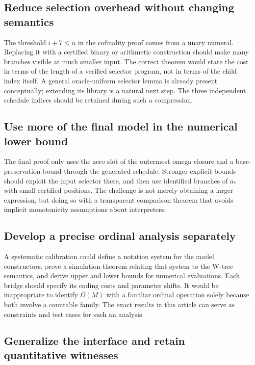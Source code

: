 \documentclass[11pt,letterpaper]{article}
\theoremstyle{definition}
\begin{document}
\subsection{Reduce selection overhead without changing semantics}

The threshold $i+7\le n$ in the cofinality proof comes from a unary numeral.
Replacing it with a certified binary or arithmetic construction should make
many branches visible at much smaller input. The correct theorem would
state the cost in terms of the length of a verified selector program, not in
terms of the child index itself. A general oracle-uniform selector lemma is
already present conceptually; extending its library is a natural next step.
The three independent schedule indices should be retained during such a
compression.

\subsection{Use more of the final model in the numerical lower bound}

The final proof only uses the zero slot of the outermost omega closure and a
base-preservation bound through the generated schedule. Stronger explicit
bounds should exploit the input selector there, and then use identified
branches of $a_*$ with small certified positions. The challenge is not
merely obtaining a larger expression, but doing so with a transparent
comparison theorem that avoids implicit monotonicity assumptions about
interpreters.

\subsection{Develop a precise ordinal analysis separately}

A systematic calibration could define a notation system for the model
constructors, prove a simulation theorem relating that system to the W-tree
semantics, and derive upper and lower bounds for numerical evaluations.
Each bridge should specify its coding costs and parameter shifts. It would
be inappropriate to identify $\Omega(M)$ with a familiar ordinal operation
solely because both involve a countable family. The exact results in this
article can serve as constraints and test cases for such an analysis.

\subsection{Generalize the interface and retain quantitative witnesses}
\end{document}
